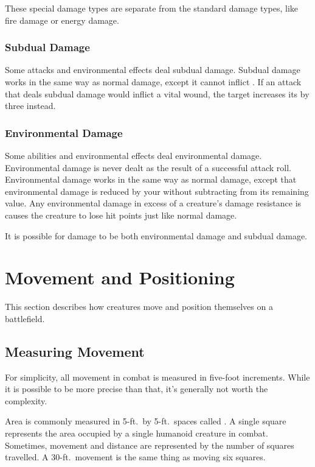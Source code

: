         These special damage types are separate from the standard damage types, like fire damage or energy damage.

        \subsubsection{Subdual Damage}\label{Subdual Damage}
            Some attacks and environmental effects deal subdual damage.
            Subdual damage works in the same way as normal damage, except it cannot inflict .
            If an attack that deals subdual damage would inflict a vital wound, the target increases its  by three instead.

        \subsubsection{Environmental Damage}\label{Environmental Damage}
            Some abilities and environmental effects deal environmental damage.
            Environmental damage is never dealt as the result of a successful attack roll.
            Environmental damage works in the same way as normal damage, except that environmental damage is reduced by your  without subtracting from its remaining value.
            Any environmental damage in excess of a creature's damage resistance is causes the creature to lose hit points just like normal damage.

            It is possible for damage to be both environmental damage and subdual damage.

\section{Movement and Positioning}\label{Movement and Positioning}

    This section describes how creatures move and position themselves on a battlefield.

    \subsection{Measuring Movement}

        For simplicity, all movement in combat is measured in five-foot increments.
        While it is possible to be more precise than that, it's generally not worth the complexity.

        \label{Squares} Area is commonly measured in 5-ft.\ by 5-ft.\ spaces called .
        A single square represents the area occupied by a single humanoid creature in combat.
        Sometimes, movement and distance are represented by the number of squares travelled.
        A 30-ft.\ movement is the same thing as moving six squares.

